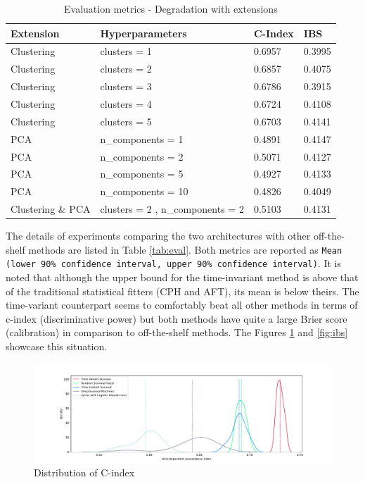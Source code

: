 \documentclass[%
 reprint,
 amsmath,amssymb,
 aps,nofootinbib
]{revtex4-2}
\begin{document}
\begin{table}[H]
  \centering
  \begin{tabular}{|p{2cm}|p{3cm}|p{1.4cm}|p{1cm}|}
     \hline
    \textbf{Extension} & \textbf{Hyperparameters} & \textbf{C-Index} & \textbf{IBS} \\
    \hline
    Clustering & clusters = 1 & 0.6957 & 0.3995 \\
    \hline
    Clustering & clusters = 2 & 0.6857 & 0.4075 \\
    \hline
    Clustering & clusters = 3 & 0.6786 & 0.3915 \\
    \hline
    Clustering & clusters = 4 & 0.6724 & 0.4108 \\
    \hline
    Clustering & clusters = 5 & 0.6703 & 0.4141 \\
    \hline
    PCA & n\_components = 1 & 0.4891 & 0.4147\\
    \hline
    PCA & n\_components = 2 & 0.5071 & 0.4127\\
    \hline
    PCA & n\_components = 5 & 0.4927 &  0.4133\\
    \hline
    PCA & n\_components = 10 & 0.4826 & 0.4049\\
    \hline
    Clustering \& PCA & clusters = 2 , n\_components = 2& 0.5103 & 0.4131\\
    \hline
  \end{tabular}
  \caption{Evaluation metrics - Degradation with extensions}
  \label{tab:eval_degrad}
\end{table}

The details of experiments comparing the two architectures with other off-the-shelf methods are listed in Table \ref{tab:eval}. Both metrics are reported as \texttt{Mean (lower 90\% confidence interval, upper 90\% confidence interval)}. It is noted that although the upper bound for the time-invariant method is above that of the traditional statistical fitters (CPH and AFT), its mean is below theirs. The time-variant counterpart seems to comfortably beat all other methods in terms of c-index (discriminative power) but both methods have quite a large Brier score (calibration) in comparison to off-the-shelf methods. The Figures \ref{fig:cindex} and \ref{fig:ibs} showcase this situation.\\


\begin{figure}[h]
  \centering
  \includegraphics[width=\textwidth]{cindex_score_dist_plot.pdf}
  \caption{Distribution of C-index}
  \label{fig:cindex}
\end{figure}
\end{document}
